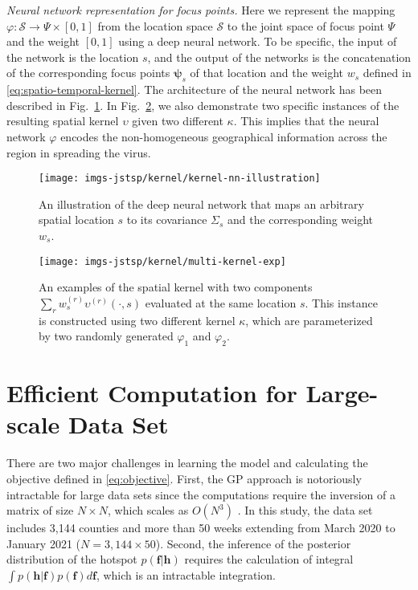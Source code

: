 \documentclass[journal]{IEEEtran}
\begin{document}
\vspace{.1in}
\noindent\emph{Neural network representation for focus points.}
Here we represent the mapping $\varphi: \mathcal{S} \to \Psi \times [0, 1]$ from the location space $\mathcal{S}$ to the joint space of focus point $\Psi$ and the weight $[0, 1]$ using a deep neural network. To be specific, the input of the network is the location $s$, and the output of the networks is the concatenation of the corresponding focus points $\boldsymbol{\psi}_s$ of that location and the weight $w_s$ defined in \eqref{eq:spatio-temporal-kernel}. The architecture of the neural network has been described in Fig.~\ref{fig:kernel-nn-illustration}. 
In Fig.~\ref{fig:kernel-instances}, we also demonstrate two specific instances of the resulting spatial kernel $\upsilon$ given two different $\kappa$. 
This implies that the neural network $\varphi$ encodes the non-homogeneous geographical information across the region in spreading the virus.

\begin{figure}[!t]
\centering
\texttt{[image: imgs-jstsp/kernel/kernel-nn-illustration]}
\caption{An illustration of the deep neural network that maps an arbitrary spatial location $s$ to its covariance $\Sigma_s$ and the corresponding weight $w_s$.}
\label{fig:kernel-nn-illustration}
\end{figure}



\begin{figure}[!t]
\centering
\texttt{[image: imgs-jstsp/kernel/multi-kernel-exp]}
\caption{An examples of the spatial kernel with two components $\sum_r w_{s}^{(r)} \upsilon^{(r)}(\cdot, s)$ evaluated at the same location $s$. This instance is constructed using two different kernel $\kappa$, which are parameterized by two randomly generated $\varphi_1$ and $\varphi_2$.}
\label{fig:kernel-instances}
\end{figure}


\section{Efficient Computation for Large-scale Data Set}
\label{sec:efficient-computation}

There are two major challenges in learning the model and calculating the objective defined in \eqref{eq:objective}.
First, the GP approach is notoriously intractable for large data sets since the computations require the inversion of a matrix of size $N \times N$, which scales as $O(N^3)$ \cite{rasmussen2003gaussian}. 
In this study, the data set includes 3,144 counties and more than 50 weeks extending from March 2020 to January 2021 ($N = 3,144 \times 50$).
Second, the inference of the posterior distribution of the hotspot $p(\mathbf f|\mathbf{h})$ requires the calculation of integral $\int p(\mathbf{h}|\mathbf{f}) p(\mathbf{f}) d\mathbf{f}$, which is an intractable integration. 
\end{document}
